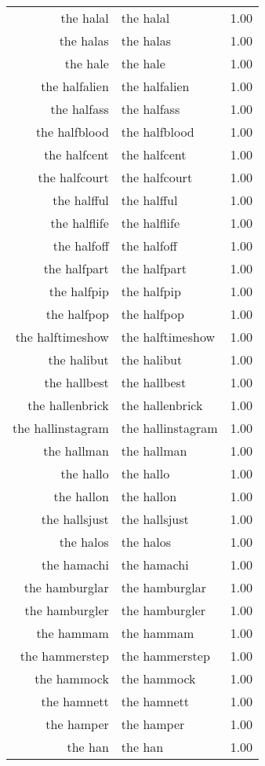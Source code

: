 \begin{table}[ht]
\begin{tabular}{rlr}
  the halal & the halal & 1.00 \\ 
  the halas & the halas & 1.00 \\ 
  the hale & the hale & 1.00 \\ 
  the halfalien & the halfalien & 1.00 \\ 
  the halfass & the halfass & 1.00 \\ 
  the halfblood & the halfblood & 1.00 \\ 
  the halfcent & the halfcent & 1.00 \\ 
  the halfcourt & the halfcourt & 1.00 \\ 
  the halfful & the halfful & 1.00 \\ 
  the halflife & the halflife & 1.00 \\ 
  the halfoff & the halfoff & 1.00 \\ 
  the halfpart & the halfpart & 1.00 \\ 
  the halfpip & the halfpip & 1.00 \\ 
  the halfpop & the halfpop & 1.00 \\ 
  the halftimeshow & the halftimeshow & 1.00 \\ 
  the halibut & the halibut & 1.00 \\ 
  the hallbest & the hallbest & 1.00 \\ 
  the hallenbrick & the hallenbrick & 1.00 \\ 
  the hallinstagram & the hallinstagram & 1.00 \\ 
  the hallman & the hallman & 1.00 \\ 
  the hallo & the hallo & 1.00 \\ 
  the hallon & the hallon & 1.00 \\ 
  the hallsjust & the hallsjust & 1.00 \\ 
  the halos & the halos & 1.00 \\ 
  the hamachi & the hamachi & 1.00 \\ 
  the hamburglar & the hamburglar & 1.00 \\ 
  the hamburgler & the hamburgler & 1.00 \\ 
  the hammam & the hammam & 1.00 \\ 
  the hammerstep & the hammerstep & 1.00 \\ 
  the hammock & the hammock & 1.00 \\ 
  the hamnett & the hamnett & 1.00 \\ 
  the hamper & the hamper & 1.00 \\ 
  the han & the han & 1.00 \\ 

\end{tabular}
\end{table}

